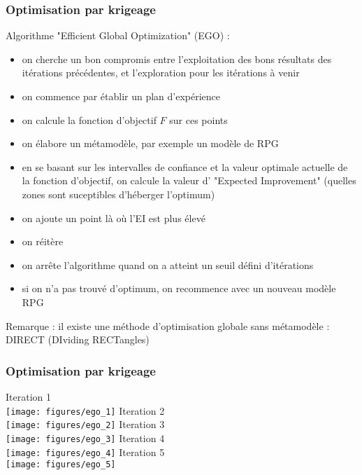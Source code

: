 \documentclass[10pt]{beamer}
\begin{document}
\begin{frame}
\frametitle{Optimisation par krigeage}

Algorithme "Efficient Global Optimization" (EGO) :
\begin{itemize}
	\item on cherche un bon compromis entre l'exploitation des bons résultats des itérations précédentes, et l'exploration pour les itérations à venir
	\item on commence par établir un plan d'expérience
	\item on calcule la fonction d'objectif $ F $ sur ces points
	\item on élabore un métamodèle, par exemple un modèle de RPG
	\item en se basant sur les intervalles de confiance et la valeur optimale actuelle de la fonction d'objectif, on calcule la valeur d' "Expected Improvement" (quelles zones sont suceptibles d'héberger l'optimum)
	\item on ajoute un point là où l'EI est plus élevé
	\item on réitère
	\item on arrête l'algorithme quand on a atteint un seuil défini d'itérations
	\item si on n'a pas trouvé d'optimum, on recommence avec un nouveau modèle RPG
\end{itemize}
Remarque : il existe une méthode d'optimisation globale sans métamodèle : DIRECT (DIviding RECTangles)

\end{frame}

\begin{frame}
\frametitle{Optimisation par krigeage}

\begin{overprint}
	\centering
	 Iteration 1\\ \texttt{[image: figures/ego\_1]}
	\onslide<2> Iteration 2\\ \texttt{[image: figures/ego\_2]}
	\onslide<3> Iteration 3\\ \texttt{[image: figures/ego\_3]}
	\onslide<4> Iteration 4\\ \texttt{[image: figures/ego\_4]}
	\onslide<5> Iteration 5\\ \texttt{[image: figures/ego\_5]}
\end{overprint}

\end{frame}
\end{document}
